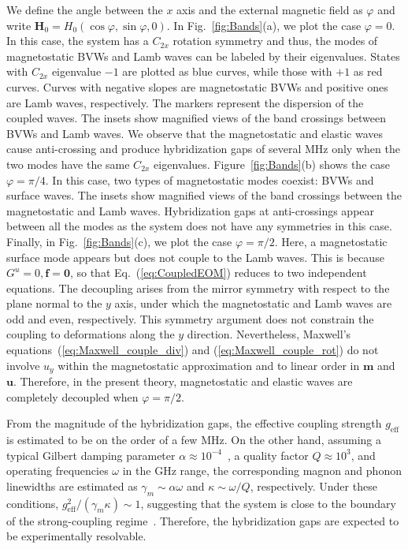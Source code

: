 \documentclass[10pt]{iopart}
\begin{document}
We define the angle between the $x$ axis and the external magnetic field as $\varphi$ and write $\bm{H}_0=H_0(\cos\varphi,\sin\varphi,0)$. In Fig.~\ref{fig:Bands}(a), we plot the case $\varphi=0$. In this case, the system has a $C_{2x}$ rotation symmetry and thus, the modes of magnetostatic BVWs and Lamb waves can be labeled by their eigenvalues. States with $C_{2x}$ eigenvalue $-1$ are plotted as blue curves, while those with $+1$ as red curves. Curves with negative slopes are magnetostatic BVWs and positive ones are Lamb waves, respectively. The markers represent the dispersion of the coupled waves. The insets show magnified views of the band crossings between BVWs and Lamb waves. We observe that the magnetostatic and elastic waves cause anti-crossing and produce hybridization gaps of several MHz only when the two modes have the same $C_{2x}$ eigenvalues. Figure~\ref{fig:Bands}(b) shows the case $\varphi=\pi/4$. In this case, two types of magnetostatic modes coexist: BVWs and surface waves. The insets show magnified views of the band crossings between the magnetostatic and Lamb waves. Hybridization gaps at anti-crossings appear between all the modes as the system does not have any symmetries in this case. Finally, in Fig.~\ref{fig:Bands}(c), we plot the case $\varphi=\pi/2$. Here, a magnetostatic surface mode appears but does not couple to the Lamb waves. This is because $G^u=0,\bm{f}=\bm{0}$, so that Eq.~(\ref{eq:CoupledEOM}) reduces to two independent equations. The decoupling arises from the mirror symmetry with respect to the plane normal to the $y$ axis, under which the magnetostatic and Lamb waves are odd and even, respectively. This symmetry argument does not constrain the coupling to deformations along the $y$ direction. Nevertheless, Maxwell's equations~(\ref{eq:Maxwell_couple_div}) and (\ref{eq:Maxwell_couple_rot}) do not involve $u_y$ within the magnetostatic approximation and to linear order in $\bm{m}$ and $\bm{u}$. Therefore, in the present theory, magnetostatic and elastic waves are completely decoupled when $\varphi=\pi/2$.

From the magnitude of the hybridization gaps, the effective coupling strength $g_{\mathrm{eff}}$ is estimated to be on the order of a few MHz. On the other hand, assuming a typical Gilbert damping parameter $\alpha \approx 10^{-4}$~\cite{YIGalpha_PRAppl}, a quality factor $Q \approx 10^3$, and operating frequencies $\omega$ in the GHz range, the corresponding magnon and phonon linewidths are estimated as $\gamma_m \sim \alpha \omega$ and $\kappa \sim \omega/Q$, respectively. Under these conditions, $g_{\mathrm{eff}}^2/(\gamma_m\kappa)\sim1$, suggesting that the system is close to the boundary of the strong-coupling regime~\cite{rodriguezClassicalQuantumDistinctions2016}. Therefore, the hybridization gaps are expected to be experimentally resolvable.
\end{document}
